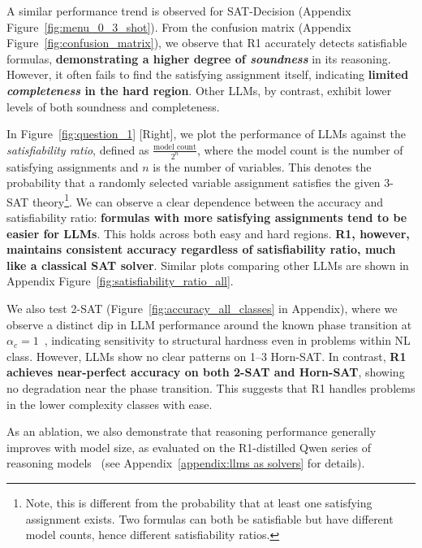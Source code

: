 \documentclass{article} %
\begin{document}
A similar performance trend is observed for SAT-Decision (Appendix Figure~\ref{fig:menu_0_3_shot}). From the confusion matrix (Appendix Figure~\ref{fig:confusion_matrix}), we observe that R1 accurately detects satisfiable formulas, \textbf{demonstrating a higher degree of \emph{soundness}} in its reasoning. However, it often fails to find the satisfying assignment itself, indicating \textbf{limited \emph{completeness} in the hard region}. Other LLMs, by contrast, exhibit lower levels of both soundness and completeness.


In Figure~\ref{fig:question_1} [Right], we plot the performance of LLMs against the \emph{satisfiability ratio}, defined as $\frac{\text{model count}}{2^n}$, where the model count is the number of satisfying assignments and $n$ is the number of variables. This denotes the probability that a randomly selected variable assignment satisfies the given 3-SAT theory\footnote{Note, this is different from the probability that at least one satisfying assignment exists. Two formulas can both be satisfiable but have different model counts, hence different satisfiability ratios.}. We can observe a clear dependence between the accuracy and satisfiability ratio: \textbf{formulas with more satisfying assignments tend to be easier for LLMs}. This holds across both easy and hard regions. \textbf{R1, however, maintains consistent accuracy regardless of satisfiability ratio, much like a classical SAT solver}. Similar plots comparing other LLMs are shown in Appendix Figure~\ref{fig:satisfiability_ratio_all}.

We also test 2-SAT (Figure~\ref{fig:accuracy_all_classes} in Appendix), where we observe a distinct dip in LLM performance around the known phase transition at $\alpha_c = 1$~\citep{2sat_phase_transition}, indicating sensitivity to structural hardness even in problems within NL class. However, LLMs show no clear patterns on 1–3 Horn-SAT. In contrast, \textbf{R1 achieves near-perfect accuracy on both 2-SAT and Horn-SAT}, showing no degradation near the phase transition. This suggests that R1 handles problems in the lower complexity classes with ease.

As an ablation, we also demonstrate that reasoning performance generally improves with model size, as evaluated on the R1-distilled Qwen series of reasoning models~\citep{deepseek_r1,qwen2025qwen25technicalreport} (see Appendix~\ref{appendix:llms as solvers} for details).
\end{document}
